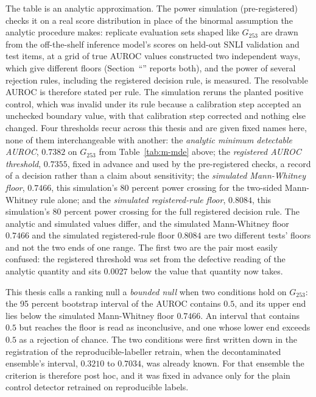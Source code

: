 The table is an analytic approximation. The power simulation (pre-registered) checks it on a real score distribution in place of the binormal assumption the analytic procedure makes: replicate
evaluation sets shaped like $G_{253}$ are drawn from the off-the-shelf inference model's scores on
held-out SNLI validation and test items, at a grid of true AUROC values constructed two independent ways, which give different floors (Section~``'' reports both), and the power of several rejection rules, including the registered decision rule, is measured.
The resolvable AUROC is therefore stated per rule. The simulation reruns the planted positive control, which was invalid
under its rule because a calibration step accepted an unchecked boundary value, with that
calibration step corrected and nothing else changed. Four thresholds recur across this thesis and
are given fixed names here, none of them interchangeable with another: the \emph{analytic
minimum
detectable AUROC}, $0.7382$ on $G_{253}$ from Table~\ref{tab:m-mde} above; the \emph{registered
AUROC threshold}, $0.7355$, fixed in advance and used by the pre-registered checks, a record of a
decision rather than a claim about sensitivity; the \emph{simulated
Mann-Whitney floor}, $0.7466$, this simulation's 80 percent power crossing for the two-sided
Mann-Whitney rule alone; and the \emph{simulated registered-rule floor}, $0.8084$, this
simulation's 80 percent power crossing for the full registered decision rule. The analytic and simulated values differ, and the simulated Mann-Whitney floor $0.7466$ and
the simulated registered-rule floor $0.8084$ are two different tests' floors and not the two
ends of one range. The first
two are the pair most easily confused: the registered threshold was set from the defective reading of the
analytic quantity and sits $0.0027$ below the value that quantity now takes.

This thesis calls a ranking null a \emph{bounded null} when two conditions hold on $G_{253}$: the 95 percent
bootstrap interval of the AUROC contains $0.5$, and its upper end lies below the simulated Mann-Whitney floor
$0.7466$.  An interval that contains $0.5$ but reaches the floor is read as
inconclusive, and one whose lower end exceeds $0.5$ as a rejection of chance. The two conditions were first written
down in the registration of the reproducible-labeller retrain, when the decontaminated ensemble's interval, $0.3210$
to $0.7034$, was already known. For that ensemble the criterion is therefore post hoc, and it was fixed in advance only for the plain control
detector retrained on reproducible labels.

